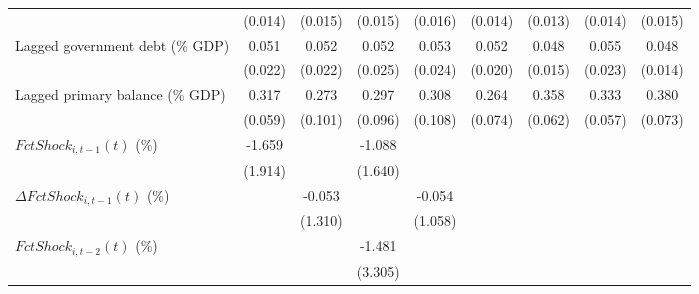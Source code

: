 {\begin{tabular}{l*{8}{c}}
                    &     (0.014)         &     (0.015)         &     (0.015)         &     (0.016)         &     (0.014)         &     (0.013)         &     (0.014)         &     (0.015)         \\
\addlinespace
Lagged government debt (\% GDP)&       0.051\sym{**} &       0.052\sym{**} &       0.052\sym{*}  &       0.053\sym{**} &       0.052\sym{**} &       0.048\sym{***}&       0.055\sym{**} &       0.048\sym{***}\\
                    &     (0.022)         &     (0.022)         &     (0.025)         &     (0.024)         &     (0.020)         &     (0.015)         &     (0.023)         &     (0.014)         \\
\addlinespace
Lagged primary balance (\% GDP)&       0.317\sym{***}&       0.273\sym{**} &       0.297\sym{***}&       0.308\sym{**} &       0.264\sym{***}&       0.358\sym{***}&       0.333\sym{***}&       0.380\sym{***}\\
                    &     (0.059)         &     (0.101)         &     (0.096)         &     (0.108)         &     (0.074)         &     (0.062)         &     (0.057)         &     (0.073)         \\
\addlinespace
$ FctShock_{i,t-1}(t)$ (\%)&      -1.659         &                     &      -1.088         &                     &                     &                     &                     &                     \\
                    &     (1.914)         &                     &     (1.640)         &                     &                     &                     &                     &                     \\
\addlinespace
$ \Delta FctShock_{i,t-1}(t)$ (\%)&                     &      -0.053         &                     &      -0.054         &                     &                     &                     &                     \\
                    &                     &     (1.310)         &                     &     (1.058)         &                     &                     &                     &                     \\
\addlinespace
$ FctShock_{i,t-2}(t)$ (\%)&                     &                     &      -1.481         &                     &                     &                     &                     &                     \\
                    &                     &                     &     (3.305)         &                     &                     &                     &                     &                     \\

\end{tabular}}
